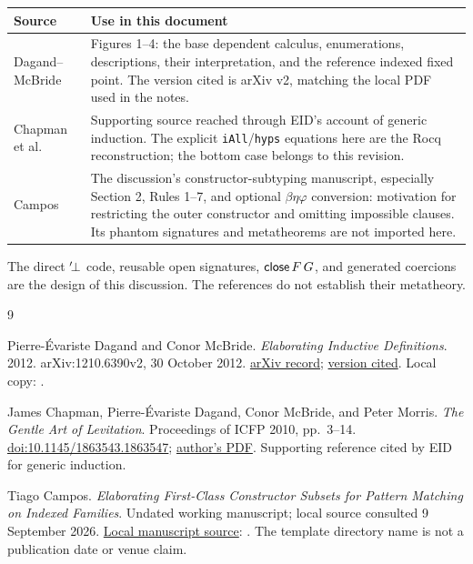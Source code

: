 \newpage
{}
\begin{center}
\begin{tabular}{@{}p{.27\linewidth}p{.67\linewidth}@{}}
\toprule
Source & Use in this document\\
\midrule
Dagand--McBride~\cite{dagand-mcbride-2012}
 & Figures 1--4: the base dependent calculus, enumerations, descriptions,
 their interpretation, and the reference indexed fixed point.
 The version cited is arXiv v2, matching the local PDF used in the notes.\\[5pt]
Chapman et al.~\cite{chapman-et-al-2010}
 & Supporting source reached through EID's account of generic induction.
 The explicit \texttt{iAll}/\texttt{hyps} equations here are the Rocq
 reconstruction; the bottom case belongs to this revision.\\[5pt]
Campos~\cite{campos-constructor-subsets}
 & The discussion's constructor-subtyping manuscript, especially
 Section 2, Rules 1--7, and optional $\beta\eta\varphi$ conversion:
 motivation for restricting the outer constructor and omitting impossible
 clauses. Its phantom signatures and metatheorems are not imported here.\\
\bottomrule
\end{tabular}
\end{center}
The direct ${}^{\prime}\!\bot$ code, reusable open signatures, $\mathsf{close}\,F\,G$,
and generated coercions are the design of this discussion. The references
do not establish their metatheory.

\begin{thebibliography}{9}
\raggedright
{}
Pierre-\'Evariste Dagand and Conor McBride.
\emph{Elaborating Inductive Definitions}.
2012. arXiv:1210.6390v2, 30 October 2012.
\href{https://arxiv.org/abs/1210.6390}{arXiv record};
\href{https://arxiv.org/pdf/1210.6390v2}{version cited}.
Local copy: .

James Chapman, Pierre-\'Evariste Dagand, Conor McBride, and Peter Morris.
\emph{The Gentle Art of Levitation}.
Proceedings of ICFP 2010, pp.~3--14.
\href{https://doi.org/10.1145/1863543.1863547}{doi:10.1145/1863543.1863547};
\href{https://jmchapman.io/papers/levitation.pdf}{author's PDF}.
Supporting reference cited by EID for generic induction.

Tiago Campos.
\emph{Elaborating First-Class Constructor Subsets for Pattern Matching on Indexed Families}.
Undated working manuscript; local source consulted 9 September 2026.
\href{../../../Subtyping-Theory/subindex/LIPIcs_2021_Version_Sample/subtyping_paper.tex}
 {Local manuscript source}:
.
The template directory name is not a publication date or venue claim.
\end{thebibliography}
